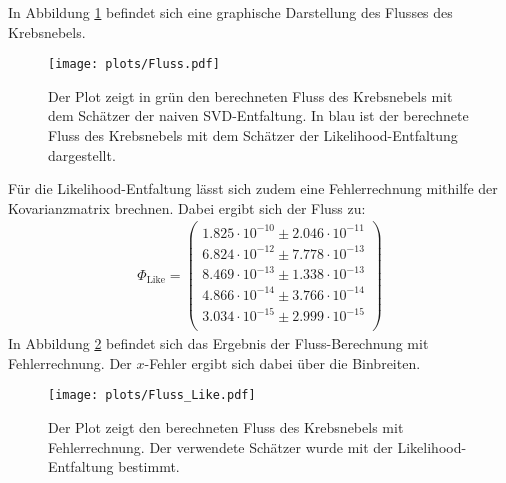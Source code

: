 In Abbildung \ref{fig:Fluss} befindet sich eine graphische Darstellung des Flusses des Krebsnebels.\\
\begin{figure}
  \centering
  \texttt{[image: plots/Fluss.pdf]}
  \caption{Der Plot zeigt in grün den berechneten Fluss des Krebsnebels mit dem Schätzer der naiven SVD-Entfaltung. In blau ist der berechnete Fluss des Krebsnebels mit dem Schätzer der Likelihood-Entfaltung dargestellt.}
  \label{fig:Fluss}
\end{figure}
Für die Likelihood-Entfaltung lässt sich zudem eine Fehlerrechnung mithilfe der Kovarianzmatrix brechnen. Dabei ergibt sich der Fluss zu:
\begin{align*}
	\Phi_{\text{Like}} = \begin{pmatrix}
			1.825\cdot10^{-10}\pm 2.046\cdot10^{-11}\\
			6.824\cdot10^{-12}\pm 7.778\cdot10^{-13}\\
			8.469\cdot10^{-13}\pm 1.338\cdot10^{-13}\\
			4.866\cdot10^{-14}\pm 3.766\cdot10^{-14}\\
			3.034\cdot10^{-15}\pm 2.999\cdot10^{-15}\\
	 \end{pmatrix}
\end{align*}
In Abbildung \ref{fig:FlussLike} befindet sich das Ergebnis der Fluss-Berechnung mit Fehlerrechnung. Der $x$-Fehler ergibt sich dabei über die Binbreiten.
\begin{figure}
  \centering
  \texttt{[image: plots/Fluss\_Like.pdf]}
  \caption{Der Plot zeigt den berechneten Fluss des Krebsnebels mit Fehlerrechnung. Der verwendete Schätzer wurde mit der Likelihood-Entfaltung bestimmt.}
  \label{fig:FlussLike}
\end{figure}
